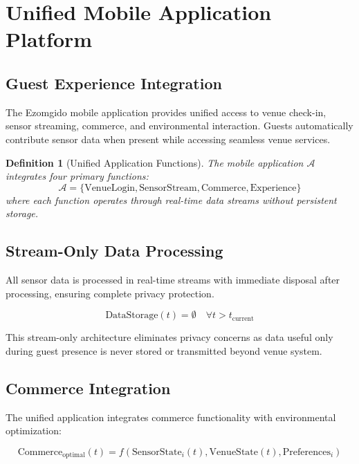 \documentclass[12pt,a4paper]{article}
\newtheorem{definition}{Definition}
\begin{document}
\section{Unified Mobile Application Platform}

\subsection{Guest Experience Integration}

The Ezomgido mobile application provides unified access to venue check-in, sensor streaming, commerce, and environmental interaction. Guests automatically contribute sensor data when present while accessing seamless venue services.

\begin{definition}[Unified Application Functions]
The mobile application $\mathcal{A}$ integrates four primary functions:
\begin{equation}
\mathcal{A} = \{\text{VenueLogin}, \text{SensorStream}, \text{Commerce}, \text{Experience}\}
\end{equation}
where each function operates through real-time data streams without persistent storage.
\end{definition}

\subsection{Stream-Only Data Processing}

All sensor data is processed in real-time streams with immediate disposal after processing, ensuring complete privacy protection.

\begin{equation}
\text{DataStorage}(t) = \emptyset \quad \forall t > t_{\text{current}}
\end{equation}

This stream-only architecture eliminates privacy concerns as data useful only during guest presence is never stored or transmitted beyond venue system.

\subsection{Commerce Integration}

The unified application integrates commerce functionality with environmental optimization:

\begin{equation}
\text{Commerce}_{\text{optimal}}(t) = f(\text{SensorState}_i(t), \text{VenueState}(t), \text{Preferences}_i)
\end{equation}
\end{document}
